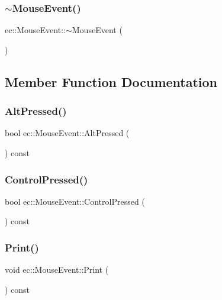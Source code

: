 \subsubsection{\texorpdfstring{$\sim$\+Mouse\+Event()}{~MouseEvent()}}
{\footnotesize\ttfamily ec\+::\+Mouse\+Event\+::$\sim$\+Mouse\+Event (\begin{DoxyParamCaption}{ }\end{DoxyParamCaption})}



\subsection{Member Function Documentation}
\mbox{\label{structec_1_1_mouse_event_a8dd57a973960b3a8d83303980ac3175e}} 
\subsubsection{\texorpdfstring{Alt\+Pressed()}{AltPressed()}}
{\footnotesize\ttfamily bool ec\+::\+Mouse\+Event\+::\+Alt\+Pressed (\begin{DoxyParamCaption}{ }\end{DoxyParamCaption}) const}

\mbox{\label{structec_1_1_mouse_event_a5260b0ecf051b865acec9837008c1e15}} 
\subsubsection{\texorpdfstring{Control\+Pressed()}{ControlPressed()}}
{\footnotesize\ttfamily bool ec\+::\+Mouse\+Event\+::\+Control\+Pressed (\begin{DoxyParamCaption}{ }\end{DoxyParamCaption}) const}

\mbox{\label{structec_1_1_mouse_event_a76584afb7dcfff8723d44611b7ae0012}} 
\subsubsection{\texorpdfstring{Print()}{Print()}}
{\footnotesize\ttfamily void ec\+::\+Mouse\+Event\+::\+Print (\begin{DoxyParamCaption}{ }\end{DoxyParamCaption}) const}

